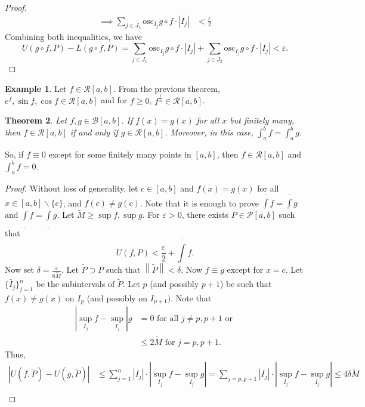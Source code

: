 \documentclass[15pt,a4paper]{book}
\newtheorem{theorem}{Theorem}[chapter]
\theoremstyle{definition}
\newtheorem{example}[theorem]{Example}
\newcommand{\abs}[1]{\left| #1 \right|} %
\newcommand{\cP}{\mathcal{P}}
\newcommand{\cR}{\mathcal{R}}
\newcommand{\cB}{\mathcal{B}}
\newcommand{\osc}{\text{osc}}
\newcommand{\norm}[1]{\left\lVert#1\right\rVert}
\begin{document}
\begin{enumerate}
\begin{proof}
\begin{align}
        \implies \sum_{j \in J_{2}} \osc_{I_{j}} g \circ f \cdot \abs{I_{j}} &< \frac{\varepsilon}{2}
    \end{align}
    Combining both inequalities, we have
    \begin{equation}
        U(g \circ f, P) - L(g \circ f, P) = \sum_{j \in J_{1}} \osc_{I_{j}} g \circ f \cdot \abs{I_{j}} + \sum_{j \in J_{2}} \osc_{I_{j}} g \circ f \cdot \abs{I_{j}} < \varepsilon.
    \end{equation}
\end{proof}
\begin{example}
    Let $f \in \cR[a,b]$. From the previous theorem, $e^{f}, \sin f, \cos f \in \cR[a,b]$ and for $f \geq 0$, $f^{\frac{1}{n}} \in \cR[a,b]$.
\end{example}
\begin{theorem}
    Let $f,g \in \cB[a,b]$. If $f(x) = g(x)$ for all $x$ but finitely many, then $f \in \cR[a,b]$ if and only if $g \in \cR[a,b]$. Moreover, in this case, $\int_{a}^{b} f = \int_{a}^{b} g$.
\end{theorem} So, if $f \equiv 0$ except for some finitely many points in $[a,b]$, then $f \in \cR[a,b]$ and $\int_{a}^{b} f = 0$.
\begin{proof}
    Without loss of generality, let $c \in [a,b]$ and $f(x) = g(x)$ for all $x \in [a,b]\backslash \{c\}$, and $f(c) \neq g(c)$. Note that it is enough to prove $\overline{\int} f = \overline{\int} g$ and $\underline{\int} f = \underline{\int} g$. Let $\tilde{M} \geq \sup f, \sup g$. For $\varepsilon > 0$, there exists $P \in \cP[a,b]$ such that
    \begin{equation}
        U(f,P) < \frac{\varepsilon}{2} + \overline{\int} f.
    \end{equation}
    Now set $\delta = \frac{\varepsilon}{8 \tilde{M}}$. Let $\tilde{P} \supset P$ such that $\norm{\tilde{P}} < \delta$. Now $f \equiv g$ except for $x = c$. Let $\{\tilde{I_{j}}\}_{j=1}^{n}$ be the subintervals of $\tilde{P}$. Let $p$ (and possibly $p+1$) be such that $f(x) \neq g(x)$ on $I_{p}$ (and possibly on $I_{p+1})$. Note that
    \begin{align*}
        \abs{\sup_{I_{j}} f - \sup_{I_{j}}} g &= 0 \text{ for all } j \neq p, p+1 \text{ or }\\
        &\leq 2\tilde{M} \text{ for } j = p,p+1.
    \end{align*}
    Thus,
    \begin{align}
        \abs{U(f,\tilde{P})-U(g,\tilde{P})} &\leq \sum_{j=1}^{n} \abs{I_{j}} \cdot \abs{\sup_{I_{j}}f - \sup_{I_{j}} g} = \sum_{j = p,p+1} \abs{I_{j}} \cdot \abs{\sup_{I_{j}}f - \sup_{I_{j}} g} \leq 4\delta \tilde{M} \\

\end{align}
\end{proof}
\end{enumerate}
\end{document}
